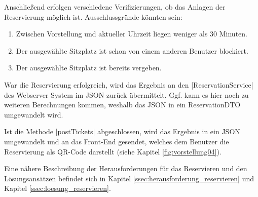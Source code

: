 Anschließend erfolgen verschiedene Verifizierungen, ob das Anlagen der Reservierung möglich ist.
Ausschlussgründe könnten sein:
\begin{enumerate}
	\item Zwischen Vorstellung und aktueller Uhrzeit liegen weniger als 30 Minuten.
	\item Der ausgewählte Sitzplatz ist schon von einem anderen Benutzer blockiert.
	\item Der ausgewählte Sitzplatz ist bereits vergeben.
\end{enumerate}
War die Reservierung erfolgreich, wird das Ergebnis an den \jinline|ReservationService| des Webserver System im \acs{JSON} zurück übermittelt.
Ggf. kann es hier noch zu weiteren Berechnungen kommen, weshalb das \acs{JSON} in ein Reservation\acs{DTO} umgewandelt wird.

Ist die Methode \jinline|postTickets| abgeschlossen, wird das Ergebnis in ein \acs{JSON} umgewandelt und an das Front-End gesendet, welches dem Benutzer die Reservierung als QR-Code darstellt (siehe Kapitel \vref{fig:vorstellung04}).

Eine nähere Beschreibung der Herausforderungen für das Reservieren und den Lösungsansätzen befindet sich in Kapitel \vref{ssec:herausforderung_reservieren} und Kapitel \vref{ssec:loesung_reservieren}.
